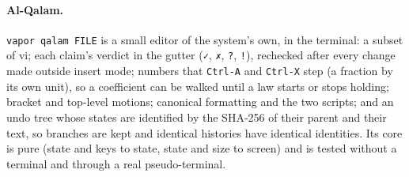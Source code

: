 \paragraph{Al-Qalam.} \texttt{vapor qalam FILE} is a small editor of the system's own, in the terminal:
a subset of vi; each claim's verdict in the gutter (\texttt{✓}, \texttt{✗}, \texttt{?}, \texttt{!}),
rechecked after every change made outside insert mode; numbers that \texttt{Ctrl-A} and \texttt{Ctrl-X}
step (a fraction by its own unit), so a coefficient can be walked until a law starts or stops holding;
bracket and top-level motions; canonical formatting and the two scripts; and an undo tree whose states
are identified by the SHA-256 of their parent and their text, so branches are kept and identical histories
have identical identities. Its core is pure (state and keys to state, state and size to screen) and is
tested without a terminal and through a real pseudo-terminal.
